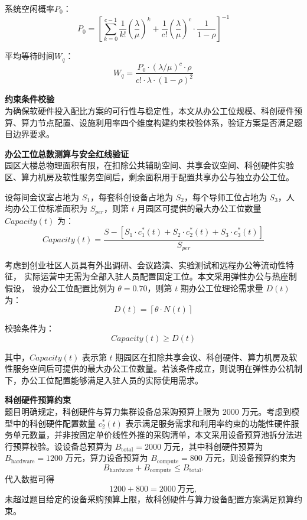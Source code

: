 \documentclass[12pt,a4paper]{article}
\begin{document}
系统空闲概率$P_0$：
\begin{equation}
P_0 = \left[ \sum_{k=0}^{c-1} \frac{1}{k!} \left( \frac{\lambda}{\mu} \right)^k + \frac{1}{c!} \left( \frac{\lambda}{\mu} \right)^c \cdot \frac{1}{1-\rho} \right]^{-1}
\end{equation}

平均等待时间$W_q$：\begin{equation}
W_q = \frac{P_0 \cdot (\lambda/\mu)^c \cdot \rho}{c! \cdot \lambda \cdot (1-\rho)^2}
\end{equation}

\textbf{约束条件校验}\\
为确保软硬件投入配比方案的可行性与稳定性，本文从办公工位规模、科创硬件预算、算力节点配置、设施利用率四个维度构建约束校验体系，验证方案是否满足题目边界要求。

\textbf{办公工位总数测算与安全红线验证}\\
园区大楼总物理面积有限，在扣除公共辅助空间、共享会议空间、科创硬件实验区、算力机房及软性服务空间后，剩余面积用于配置共享办公与独立办公工位。

设每间会议室占地为 $S_1$，每套科创设备占地为 $S_2$，每个导师工位占地为 $S_3$，人均办公工位标准面积为 $S_{per}$，则第 $t$ 月园区可提供的最大办公工位数量 $Capacity(t)$ 为：
\begin{equation}
Capacity(t) = \frac{S - \left[ S_1 \cdot c_1^*(t) + S_2 \cdot c_2^*(t) + S_3 \cdot c_3^*(t) \right]}{S_{per}}
\end{equation}

考虑到创业社区人员具有外出调研、会议路演、实验测试和远程办公等流动性特征，
实际运营中无需为全部入驻人员配置固定工位。本文采用弹性办公与热座制假设，
设办公工位配置比例为 $\theta=0.70$，则第 $t$ 期办公工位理论需求量 $D(t)$ 为：
\begin{equation}
D(t)=\left\lceil \theta \cdot N(t) \right\rceil
\end{equation}

校验条件为：
\begin{equation}
Capacity(t)\geq D(t)
\end{equation}

其中，$Capacity(t)$ 表示第 $t$ 期园区在扣除共享会议、科创硬件、算力机房及软性服务空间后可提供的最大办公工位数量。若该条件成立，则说明在弹性办公机制下，办公工位配置能够满足入驻人员的实际使用需求。

\textbf{科创硬件预算约束}\\
题目明确规定，科创硬件与算力集群设备总采购预算上限为 $2000$ 万元。考虑到模型中的科创硬件配置数量 $c_2^*(t)$ 表示满足服务需求和利用率约束的功能性硬件服务单元数量，并非按固定单价线性外推的采购清单，本文采用设备预算池拆分法进行预算校验。设设备总预算为 $B_{\mathrm{total}}=2000$ 万元，其中科创硬件预算为 $B_{\mathrm{hardware}}=1200$ 万元，算力设备预算为 $B_{\mathrm{compute}}=800$ 万元，则设备预算约束为
\begin{equation}
B_{\mathrm{hardware}}+B_{\mathrm{compute}}\leq B_{\mathrm{total}} .
\end{equation}
代入数据可得
\begin{equation}
1200+800=2000 \ \text{万元},
\end{equation}
未超过题目给定的设备采购预算上限，故科创硬件与算力设备配置方案满足预算约束。
\end{document}
